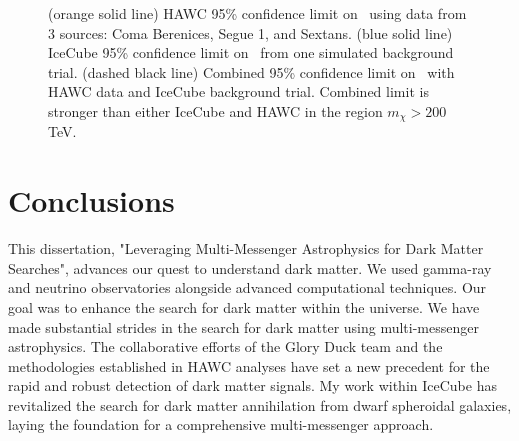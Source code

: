 \begin{figure}
    \caption{(orange solid line) HAWC 95\% confidence limit on \sv~using data from 3 sources: Coma Berenices, Segue 1, and Sextans. (blue solid line) IceCube 95\% confidence limit on \sv~from one simulated background trial. (dashed black line) Combined 95\% confidence limit on \sv~with HAWC data and IceCube background trial. Combined limit is stronger than either IceCube and HAWC in the region $m_\chi > 200$ TeV. }
    \label{fig:nuDuck_mockdata}
\end{figure}

\section{Conclusions}\label{sec:conclusions}

This dissertation, "Leveraging Multi-Messenger Astrophysics for Dark Matter Searches", advances our quest to understand dark matter.
We used gamma-ray and neutrino observatories alongside advanced computational techniques.
Our goal was to enhance the search for dark matter within the universe.
We have made substantial strides in the search for dark matter using multi-messenger astrophysics.
The collaborative efforts of the Glory Duck team and the methodologies established in HAWC analyses have set a new precedent for the rapid and robust detection of dark matter signals.
My work within IceCube has revitalized the search for dark matter annihilation from dwarf spheroidal galaxies, laying the foundation for a comprehensive multi-messenger approach.

